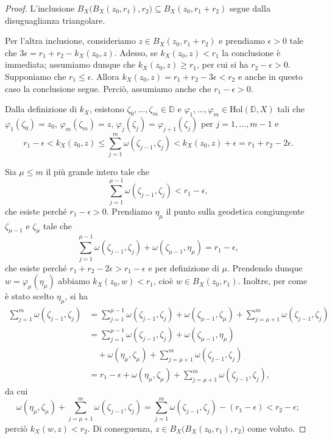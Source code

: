 \begin{proof}
    L'inclusione $B_X\big(B_X(z_0,r_1),r_2\big)\subseteq B_X(z_0,r_1+r_2)$ segue dalla disuguaglianza triangolare.

    Per l'altra inclusione, consideriamo $z \in B_X(z_0,r_1+r_2)$ e prendiamo $\epsilon>0$ tale che $3\epsilon=r_1+r_2-k_X(z_0,z)$. Adesso, se $k_X(z_0,z)<r_1$ la conclusione è immediata; assumiamo dunque che $k_X(z_0,z)\ge r_1$, per cui si ha $r_2-\epsilon>0$. Supponiamo che $r_1 \le \epsilon$. Allora $k_X(z_0,z)=r_1+r_2-3\epsilon<r_2$ e anche in questo caso la conclusione segue. Perciò, assumiamo anche che $r_1-\epsilon>0$.

    Dalla definizione di $k_X$, esistono $\zeta_0,\dots,\zeta_m \in \mathbb{D}$ e $\varphi_1,\dots,\varphi_m \in \text{Hol}(\mathbb{D},X)$ tali che $\varphi_1(\zeta_0)=z_0$, $\varphi_m(\zeta_m)=z$, $\varphi_j(\zeta_j)=\varphi_{j+1}(\zeta_j)$ per $j=1,\dots,m-1$ e
    $$r_1-\epsilon<k_X(z_0,z) \le \sum_{j=1}^m \omega(\zeta_{j-1},\zeta_j)<k_X(z_0,z)+\epsilon=r_1+r_2-2\epsilon.$$

    Sia $\mu \le m$ il più grande intero tale che
    $$\sum_{j=1}^{\mu-1} \omega(\zeta_{j-1},\zeta_j)<r_1-\epsilon,$$
    che esiste perché $r_1-\epsilon>0$. Prendiamo $\eta_{\mu}$ il punto sulla geodetica congiungente $\zeta_{\mu-1}$ e $\zeta_{\mu}$ tale che
    $$\sum_{j=1}^{\mu-1} \omega(\zeta_{j-1},\zeta_j)+\omega(\zeta_{\mu-1},\eta_{\mu})=r_1-\epsilon,$$
    che esiste perché $r_1+r_2-2\epsilon>r_1-\epsilon$ e per definizione di $\mu$. Prendendo dunque $w=\varphi_{\mu}(\eta_{\mu})$ abbiamo $k_X(z_0,w)<r_1$, cioè $w\in B_X(z_0,r_1)$. Inoltre, per come è stato scelto $\eta_{\mu}$, si ha
    \begin{align*}
        \sum_{j=1}^m \omega(\zeta_{j-1},\zeta_j)&=\sum_{j=1}^{\mu-1} \omega(\zeta_{j-1},\zeta_j)+\omega(\zeta_{\mu-1},\zeta_{\mu})+\sum_{j=\mu+1}^m \omega(\zeta_{j-1},\zeta_j)\\
        &=\sum_{j=1}^{\mu-1} \omega(\zeta_{j-1},\zeta_j)+\omega(\zeta_{\mu-1},\eta_{\mu})\\
        &\quad+\omega(\eta_{\mu},\zeta_{\mu})+\sum_{j=\mu+1}^m \omega(\zeta_{j-1},\zeta_j)\\
        &=r_1-\epsilon+\omega(\eta_{\mu},\zeta_{\mu})+\sum_{j=\mu+1}^m \omega(\zeta_{j-1},\zeta_j),
    \end{align*}
    da cui
    $$\omega(\eta_{\mu},\zeta_{\mu})+\sum_{j=\mu+1}^m \omega(\zeta_{j-1},\zeta_j)=\sum_{j=1}^m \omega(\zeta_{j-1},\zeta_j)-(r_1-\epsilon)<r_2-\epsilon;$$
    perciò $k_X(w,z)<r_2$. Di conseguenza, $z \in B_X\big(B_X(z_0,r_1),r_2\big)$ come voluto.
\end{proof}

